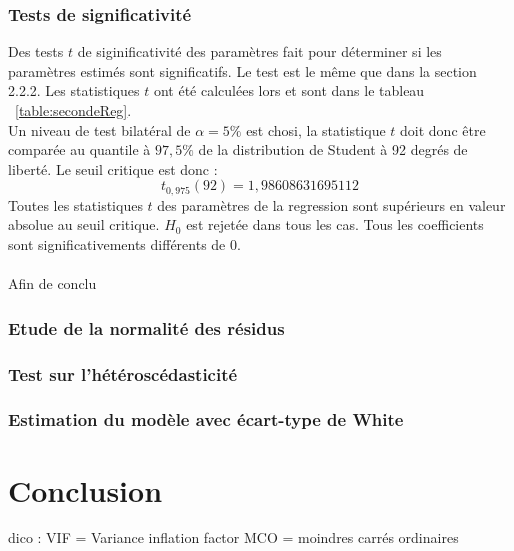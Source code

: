 \documentclass[]{article}
\begin{document}
\subsubsection{Tests de significativité}
Des tests $t$ de siginificativité des paramètres fait pour déterminer si les paramètres estimés sont significatifs. Le test est le même que dans la
section 2.2.2. Les statistiques $t$ ont été calculées lors et sont dans le tableau ~\ref{table:secondeReg}.\\

Un niveau de test bilatéral de $\alpha = 5 \%$ est chosi, la statistique  $t$ doit donc être comparée au quantile à  $97,5\%$ de la distribution de
Student à 92 degrés de liberté. Le seuil critique est donc :
\begin{equation*}
t_{0,975}(92) = 1,98608631695112 
\end{equation*}
Toutes les statistiques $t$ des paramètres de la regression sont supérieurs en valeur absolue au seuil critique. $H_0$ est rejetée dans tous les cas.
Tous les coefficients sont significativements différents de 0.
\\ \\
Afin de conclu
\subsubsection{Etude de la normalité des résidus}
\subsubsection{Test sur l'hétéroscédasticité}
\subsubsection{Estimation du modèle avec écart-type de White}
\section{Conclusion}

dico : VIF = Variance inflation factor
MCO = moindres carrés ordinaires
\end{document}
